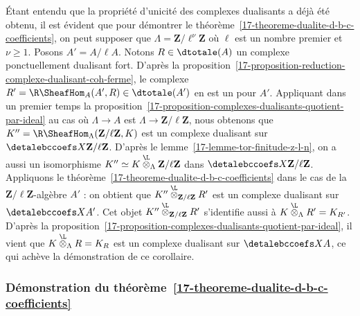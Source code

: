 \documentclass[10pt]{../fichiers-configuration-latex/smfart}
\begin{document}
Étant entendu que la propriété d'unicité des complexes dualisants a déjà
été obtenu, il est évident que pour démontrer le
théorème~\ref{17-theoreme-dualite-d-b-c-coefficients}, on peut supposer que
$\Lambda=\mathbf{Z}/\ell^\nu\mathbf{Z}$ où $\ell$ est un nombre premier et
$\nu\geq 1$. Posons $A'=A/\ell A$. Notons $R\in\dtotale(A)$ un complexe
ponctuellement dualisant fort. D'après la
proposition~\ref{17-proposition-reduction-complexe-dualisant-coh-ferme}, le
complexe $R'=\R\SheafHom_A(A',R)\in\dtotale(A')$ en est un pour $A'$.
Appliquant dans un premier temps la
proposition~\ref{17-proposition-complexes-dualisants-quotient-par-ideal} au
cas où $\Lambda\to A$ est $\Lambda\to \mathbf{Z}/\ell\mathbf{Z}$, nous
obtenons que $K''=\R\SheafHom_\Lambda(\mathbf{Z}/\ell\mathbf{Z},K)$
est un complexe dualisant sur $\detalebccoefs X {\mathbf{Z}/\ell\mathbf{Z}}$.
D'après le lemme~\ref{17-lemme-tor-finitude-z-l-n}, on a aussi un isomorphisme
$K''\simeq K\overset{\L}\otimes_\Lambda\mathbf{Z}/\ell\mathbf{Z}$
dans $\detalebccoefs X {\mathbf{Z}/\ell\mathbf{Z}}$. Appliquons le
théorème~\ref{17-theoreme-dualite-d-b-c-coefficients} dans le cas de la
$\mathbf{Z}/\ell\mathbf{Z}$-algèbre $A'$ : on obtient que
$K''\overset{\L}\otimes_{\mathbf{Z}/\ell\mathbf{Z}} R'$ est un complexe
dualisant sur $\detalebccoefs X {A'}$. Cet objet
$K''\overset{\L}\otimes_{\mathbf{Z}/\ell\mathbf{Z}} R'$ s'identifie
aussi à $K\overset{\L}\otimes_\Lambda R'=K_{R'}$. D'après la
proposition~\ref{17-proposition-complexes-dualisants-quotient-par-ideal}, il
vient que $K\overset{\L}\otimes_\Lambda R=K_R$ est un complexe
dualisant sur $\detalebccoefs X A$, ce qui achève la démonstration de ce
corollaire.

\subsubsection{Démonstration du théorème~\ref{17-theoreme-dualite-d-b-c-coefficients}}%
\end{document}
